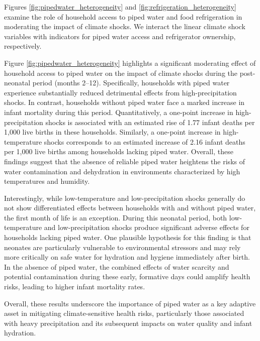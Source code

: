 \documentclass[a4paper]{article}
\begin{document}
Figures \ref{fig:pipedwater_heterogeneity} and \ref{fig:refrigeration_heterogeneity} examine the role of household access to piped water and food refrigeration in moderating the impact of climate shocks.  We interact the linear climate shock variables with indicators for piped water access and refrigerator ownership, respectively.

Figure \ref{fig:pipedwater_heterogeneity} highlights a significant moderating effect of household access to piped water on the impact of climate shocks during the post-neonatal period (months 2–12). Specifically, households with piped water experience substantially reduced detrimental effects from high-precipitation shocks. In contrast, households without piped water face a marked increase in infant mortality during this period. Quantitatively, a one-point increase in high-precipitation shocks is associated with an estimated rise of 1.77 infant deaths per 1,000 live births in these households. Similarly, a one-point increase in high-temperature shocks corresponds to an estimated increase of 2.16 infant deaths per 1,000 live births among households lacking piped water. Overall, these findings suggest that the absence of reliable piped water heightens the risks of water contamination and dehydration in environments characterized by high temperatures and humidity.

Interestingly, while low-temperature and low-precipitation shocks generally do not show differentiated effects between households with and without piped water, the first month of life is an exception. During this neonatal period, both low-temperature and low-precipitation shocks produce significant adverse effects for households lacking piped water. One plausible hypothesis for this finding is that neonates are particularly vulnerable to environmental stressors and may rely more critically on safe water for hydration and hygiene immediately after birth. In the absence of piped water, the combined effects of water scarcity and potential contamination during these early, formative days could amplify health risks, leading to higher infant mortality rates.

Overall, these results underscore the importance of piped water as a key adaptive asset in mitigating climate-sensitive health risks, particularly those associated with heavy precipitation and its subsequent impacts on water quality and infant hydration.
\end{document}

